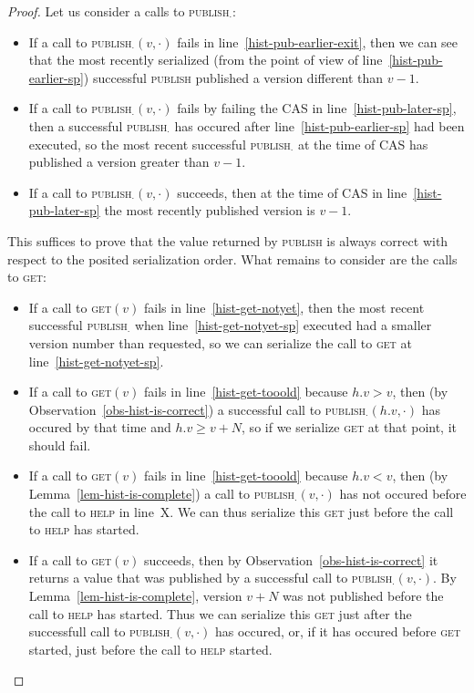 \documentclass[a4paper,11pt]{article}
\newcommand{\fn}[1]{\textsc{#1}}
\begin{document}
\begin{proof}
Let us consider a calls to \fn{publish$_\cdot$}:
\begin{itemize}
\item If a call to \fn{publish$_\cdot$}$(v, \cdot)$ fails in line~\ref{hist-pub-earlier-exit}, then we can see that the most recently serialized (from the point of view of line~\ref{hist-pub-earlier-sp}) successful \fn{publish} published a version different than $v-1$.
\item If a call to \fn{publish$_\cdot$}$(v, \cdot)$ fails by failing the CAS in line~\ref{hist-pub-later-sp}, then a successful \fn{publish$_\cdot$} has occured after line~\ref{hist-pub-earlier-sp} had been executed, so the most recent successful \fn{publish$_\cdot$} at the time of \fn{CAS} has published a version greater than $v-1$.
\item If a call to \fn{publish$_\cdot$}$(v, \cdot)$ succeeds, then at the time of CAS in line~\ref{hist-pub-later-sp} the most recently published version is $v-1$.
	\end{itemize}
	This suffices to prove that the value returned by \fn{publish} is always correct with respect to the posited
	serialization order. What remains to consider are the calls to \fn{get}:
\begin{itemize}
	\item If a call to \fn{get}$(v)$ fails in line~\ref{hist-get-notyet}, then the most recent successful \fn{publish$_\cdot$} when line~\ref{hist-get-notyet-sp} executed had a smaller version number than requested, so we can serialize the call to \fn{get} at line~\ref{hist-get-notyet-sp}.
	\item If a call to \fn{get}$(v)$ fails in line~\ref{hist-get-tooold} because $h.v > v$, then (by Observation~\ref{obs-hist-is-correct}) a successful call to \fn{publish$_\cdot$}$(h.v, \cdot)$ has occured by that time and $h.v \geq v+N$, so if we serialize \fn{get} at that point, it should fail.
	\item If a call to \fn{get}$(v)$ fails in line~\ref{hist-get-tooold} because $h.v < v$, then (by Lemma~\ref{lem-hist-is-complete}) a call to \fn{publish$_\cdot$}$(v, \cdot)$ has not occured before the call to \fn{help} in line~X. We can thus serialize this \fn{get} just before the call to \fn{help} has started.
	\item If a call to \fn{get}$(v)$ succeeds, then by Observation~\ref{obs-hist-is-correct} it returns a value that was published by a successful call to \fn{publish$_\cdot$}$(v, \cdot)$. By Lemma~\ref{lem-hist-is-complete}, version $v+N$ was not published before the call to \fn{help} has started. Thus we can serialize this \fn{get} just after the successfull call to \fn{publish$_\cdot$}$(v, \cdot)$ has occured, or, if it has occured before \fn{get} started, just before the call to \fn{help} started.
\end{itemize}
\end{proof}
\end{document}
